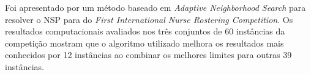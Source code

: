 
Foi apresentado por \cite{lu:2012} um método baseado em \textit{Adaptive Neighborhood Search} para resolver o \ac{NSP} para do \textit{ First International Nurse Rostering Competition}.  Os resultados computacionais avaliados nos três conjuntos de 60 instâncias da competição mostram que o algoritmo utilizado melhora os resultados mais conhecidos por 12 instâncias ao combinar os melhores limites para outras 39 instâncias.








